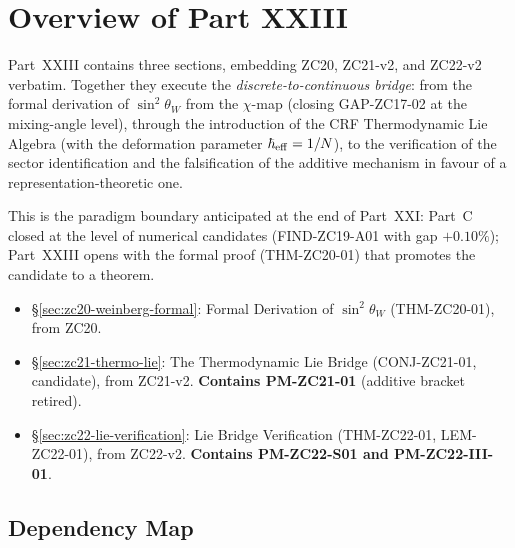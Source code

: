 \documentclass[12pt, a4paper]{article}
\begin{document}
\section*{Overview of Part XXIII}

Part~XXIII contains three sections, embedding ZC20, ZC21-v2, and
ZC22-v2 verbatim. Together they execute the
\emph{discrete-to-continuous bridge}: from the formal derivation of
$\sin^2\theta_W$ from the $\chi$-map (closing GAP-ZC17-02 at the
mixing-angle level), through the introduction of the CRF
Thermodynamic Lie Algebra (with the deformation parameter
$\hbar_{\rm eff} = 1/N$), to the verification of the sector
identification and the falsification of the additive mechanism in
favour of a representation-theoretic one.

This is the paradigm boundary anticipated at the end of Part~XXI:
Part~C closed at the level of numerical candidates (FIND-ZC19-A01
with gap $+0.10\%$); Part~XXIII opens with the formal proof
(THM-ZC20-01) that promotes the candidate to a theorem.

\begin{itemize}[leftmargin=2em]
\item \S\ref{sec:zc20-weinberg-formal}: Formal Derivation of
  $\sin^2\theta_W$ (THM-ZC20-01), from ZC20.
\item \S\ref{sec:zc21-thermo-lie}: The Thermodynamic Lie Bridge
  (CONJ-ZC21-01, candidate), from ZC21-v2.
  \textbf{Contains PM-ZC21-01} (additive bracket retired).
\item \S\ref{sec:zc22-lie-verification}: Lie Bridge Verification
  (THM-ZC22-01, LEM-ZC22-01), from ZC22-v2.
  \textbf{Contains PM-ZC22-S01 and PM-ZC22-III-01}.
\end{itemize}

\subsection*{Dependency Map}

\begin{center}
\end{center}
\end{document}
